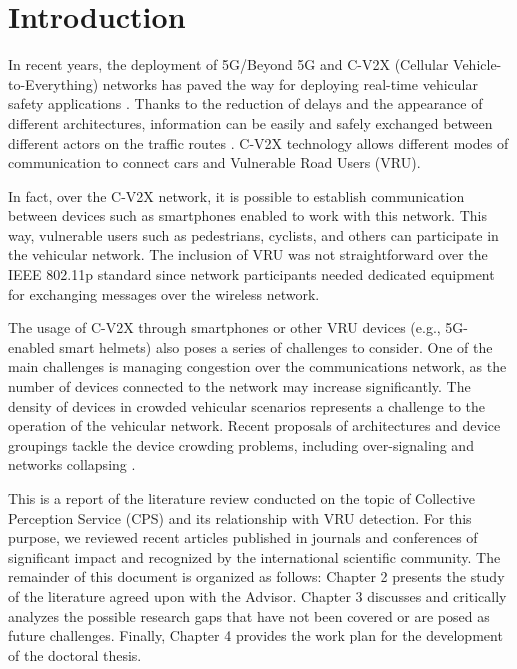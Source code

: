 \chapter{Introduction}

In recent years, the deployment of 5G/Beyond 5G and C-V2X (Cellular Vehicle-to-Everything) networks has paved the way for deploying real-time vehicular safety applications \cite{ul2019green}. Thanks to the reduction of delays and the appearance of different architectures, information can be easily and safely exchanged between different actors on the traffic routes \cite{tudzarov2011functional}. C-V2X technology allows different modes of communication to connect cars and Vulnerable Road Users (VRU). 

In fact, over the C-V2X network, it is possible to establish communication between devices such as smartphones enabled to work with this network. This way, vulnerable users such as pedestrians, cyclists, and others can participate in the vehicular network. The inclusion of VRU was not straightforward over the IEEE 802.11p standard since network participants needed dedicated equipment for exchanging messages over the wireless network.


The usage of C-V2X through smartphones or other VRU devices (e.g., 5G-enabled smart helmets) also poses a series of challenges to consider. One of the main challenges is managing congestion over the communications network, as the number of devices connected to the network may increase significantly. The density of devices in crowded vehicular scenarios represents a challenge to the operation of the vehicular network. Recent proposals of architectures and device groupings tackle the device crowding problems, including over-signaling and networks collapsing \cite{hakeem20205g}.

This is a report of the literature review conducted on the topic of Collective Perception Service (CPS) and its relationship with VRU detection.%
For this purpose, we reviewed recent articles published in journals and conferences of significant impact and recognized by the international scientific community. The remainder of this document is organized as follows: Chapter 2 presents the study of the literature agreed upon with the Advisor. Chapter 3 discusses and critically analyzes the possible research gaps that have not been covered or are posed as future challenges. Finally, Chapter 4 provides the work plan for the development of the doctoral thesis. 